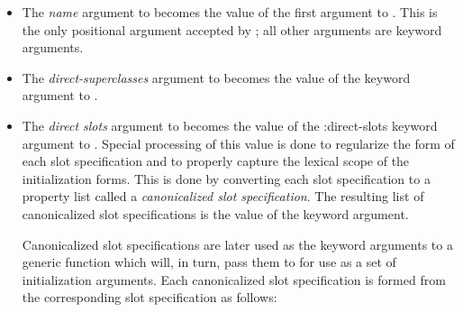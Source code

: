   \begin{itemize}
  \item 
    The \emph{name} argument to  becomes the value of the first argument to
    . This is the only positional argument accepted by ;
    all other arguments are keyword arguments. 
  \item 
    The \emph{direct-superclasses} argument to  becomes the value of the
     keyword argument to . 
  \item 
    The \emph{direct slots} argument to  becomes the value of the :direct-slots
    keyword argument to . Special processing of this value is done
    to regularize the form of each slot specification and to properly capture
    the lexical scope of the initialization forms. This is done by converting
    each slot specification to a property list called a \emph{canonicalized slot
      specification}. The resulting list of canonicalized slot specifications is
    the value of the  keyword argument. 

    Canonicalized slot specifications are later used as the keyword arguments to
    a generic function which will, in turn, pass them to  for use
    as a set of initialization arguments. Each canonicalized slot specification
    is formed from the corresponding slot specification as follows:


\end{itemize}

